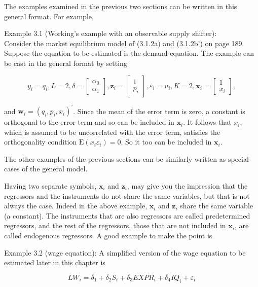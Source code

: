 \documentclass[10pt]{article}
\begin{document}
The examples examined in the previous two sections can be written in this general format. For example,

Example 3.1 (Working's example with an observable supply shifter):\\
Consider the market equilibrium model of (3.1.2a) and (3.1.2b') on page 189. Suppose the equation to be estimated is the demand equation. The example can be cast in the general format by setting

$$
y_{i}=q_{i}, L=2, \delta=\left[\begin{array}{l}
\alpha_{0} \\
\alpha_{1}
\end{array}\right], \mathbf{z}_{i}=\left[\begin{array}{c}
1 \\
p_{i}
\end{array}\right], \varepsilon_{i}=u_{i}, K=2, \mathbf{x}_{i}=\left[\begin{array}{c}
1 \\
x_{i}
\end{array}\right],
$$

and $\mathbf{w}_{i}=\left(q_{i}, p_{i}, x_{i}\right)^{\prime}$. Since the mean of the error term is zero, a constant is orthogonal to the error term and so can be included in $\mathbf{x}_{i}$. It follows that $x_{i}$, which is assumed to be uncorrelated with the error term, satisfies the orthogonality condition $\mathrm{E}\left(x_{i} \varepsilon_{i}\right)=0$. So it too can be included in $\mathbf{x}_{i}$.

The other examples of the previous sections can be similarly written as special cases of the general model.

Having two separate symbols, $\mathbf{x}_{i}$ and $\mathbf{z}_{i}$, may give you the impression that the regressors and the instruments do not share the same variables, but that is not always the case. Indeed in the above example, $\mathbf{x}_{i}$ and $\mathbf{z}_{i}$ share the same variable (a constant). The instruments that are also regressors are called predetermined regressors, and the rest of the regressors, those that are not included in $\mathbf{x}_{i}$, are called endogenous regressors. A good example to make the point is

Example 3.2 (wage equation): A simplified version of the wage equation to be estimated later in this chapter is

$$
L W_{i}=\delta_{1}+\delta_{2} S_{i}+\delta_{3} E X P R_{i}+\delta_{4} I Q_{i}+\varepsilon_{i}
$$
\end{document}
